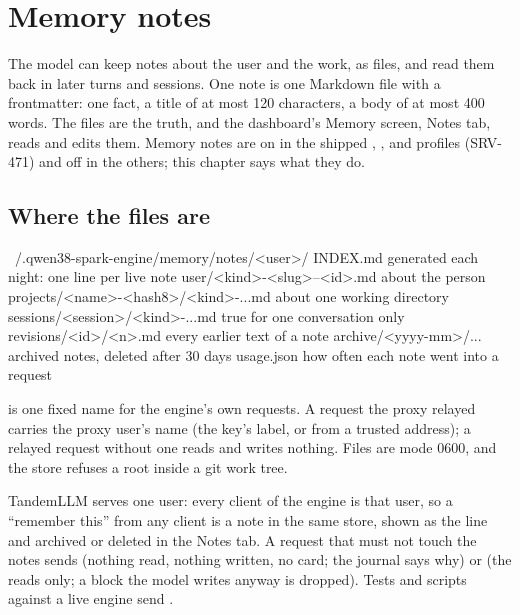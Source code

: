 \chapter{Memory notes}\label{ch:memory}

The model can keep notes about the user and the work, as files, and read them back in later turns and sessions. One note is one Markdown file with a frontmatter: one fact, a title of at most 120 characters, a body of at most 400 words. The files are the truth, and the dashboard's Memory screen, Notes tab, reads and edits them. Memory notes are on in the shipped , ,  and  profiles (SRV-471) and off in the others; this chapter says what they do.

\section{Where the files are}

\begin{plain}
~/.qwen38-spark-engine/memory/notes/<user>/
  INDEX.md                               generated each night: one line per live note
  user/<kind>-<slug>--<id>.md            about the person
  projects/<name>-<hash8>/<kind>-...md   about one working directory
  sessions/<session>/<kind>-...md        true for one conversation only
  revisions/<id>/<n>.md                  every earlier text of a note
  archive/<yyyy-mm>/...                  archived notes, deleted after 30 days
  usage.json                             how often each note went into a request
\end{plain}

 is one fixed name for the engine's own requests. A request the proxy relayed carries the proxy user's name (the key's label, or  from a trusted address); a relayed request without one reads and writes nothing. Files are mode 0600, and the store refuses a root inside a git work tree.

TandemLLM serves one user: every client of the engine is that user, so a ``remember this'' from any client is a note in the same store, shown as the line  and archived or deleted in the Notes tab. A request that must not touch the notes sends  (nothing read, nothing written, no card; the journal says why) or  (the reads only; a block the model writes anyway is dropped). Tests and scripts against a live engine send .

